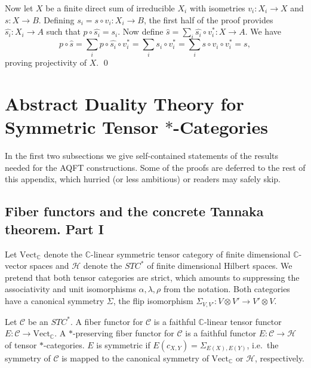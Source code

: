 \documentclass[12pt]{article}
\theoremstyle{definition}
\theoremstyle{definition}
\theoremstyle{remark}
\newcommand{\Vect}{\mathrm{Vect}}
\def\2#1{{\mathcal #1}}
\def\7#1{{\mathbb #1}}
\newcommand{\rarr}{\rightarrow}
\begin{document}
Now let $X$ be a finite direct sum of irreducible $X_i$ with isometries $v_i:X_i\rarr X$ and $s:X\rarr B$.
Defining $s_i=s\circ v_i:X_i\rarr B$, the first half of the proof provides $\widehat{s_i}:X_i\rarr A$
such that $p\circ\widehat{s_i}=s_i$. Now define $\widehat{s}=\sum_i \widehat{s_i}\circ v_i^*:X\rarr A$.
We have 
\[ p\circ\widehat{s}=\sum_i p\circ\widehat{s_i}\circ v_i^*=\sum_i s_i\circ v_i^* 
   =\sum_i s\circ v_i\circ v_i^* = s, \]
proving projectivity of $X$.
\qed










\section{Abstract Duality Theory for Symmetric Tensor $*$-Categories} \label{App-B}
In the first two subsections we give self-contained statements of the results needed for the AQFT
constructions. Some of the proofs are deferred to the rest of this appendix, which hurried (or less
ambitious) or readers may safely skip. 

\subsection{Fiber functors and the concrete Tannaka theorem. Part I} \label{ss-concrete1}
Let $\Vect_\7C$ denote the $\7C$-linear symmetric tensor category of finite dimensional $\7C$-vector
spaces and $\2H$ denote the $STC^*$ of finite dimensional Hilbert spaces. We pretend that both
tensor categories are strict, which amounts to suppressing the associativity and unit isomorphisms
$\alpha,\lambda,\rho$ from the notation. Both categories have a canonical symmetry $\Sigma$, the
flip isomorphism $\Sigma_{V,V'}: V\otimes V'\rarr V'\otimes V$.  

\bdefin {}
Let $\2C$ be an $STC^*$. A fiber functor for $\2C$ is a faithful $\7C$-linear tensor functor
$E:\2C\rarr\Vect_\7C$. A $*$-preserving fiber functor for $\2C$ is a faithful functor $E: \2C\rarr\2H$
of tensor $*$-categories. $E$ is symmetric if $E(c_{X,Y})=\Sigma_{E(X),E(Y)}$, i.e.\ the symmetry of  
$\2C$ is mapped to the canonical symmetry of $\Vect_\7C$ or $\2H$, respectively.
\edefin
\end{document}
